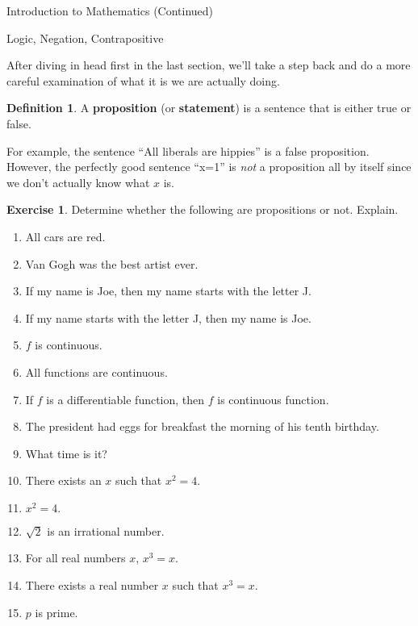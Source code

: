 \documentclass[11pt]{article}
\theoremstyle{definition}
\newtheorem{definition}[theorem]{Definition}
\newtheorem{exercise}[theorem]{Exercise}
\begin{document}
\addtocounter{section}{0}

\begin{section}{Introduction to Mathematics (Continued)}

\addtocounter{subsection}{1}
\addtocounter{theorem}{15}

\begin{subsection}{Logic, Negation, Contrapositive}

After diving in head first in the last section, we'll take a step back and do a more careful examination of what it is we are actually doing.

\begin{definition}
A \textbf{proposition} (or \textbf{statement}) is a sentence that is either true or false.
\end{definition}

For example, the sentence ``All liberals are hippies'' is a false proposition.  However, the perfectly good sentence ``x=1'' is \emph{not} a proposition all by itself since we don't actually know what $x$ is.

\begin{exercise} Determine whether the following are propositions or not. Explain.
\begin{enumerate}
\item All cars are red.
\item Van Gogh was the best artist ever. 
\item If my name is Joe, then my name starts with the letter J.
\item If my name starts with the letter J, then my name is Joe.
\item $f$ is continuous.
\item All functions are continuous.
\item If $f$ is a differentiable function, then $f$ is continuous function.
\item The president had eggs for breakfast the morning of his tenth birthday.
\item What time is it? 
\item There exists an $x$ such that $x^2=4$.
\item $x^2=4.$
\item $\sqrt{2}$ is an irrational number.
\item For all real numbers $x$, $x^3=x$.
\item There exists a real number $x$ such that $x^3=x$.
\item $p$ is prime.
\end{enumerate}
\end{exercise}


\end{subsection}
\end{section}
\end{document}

